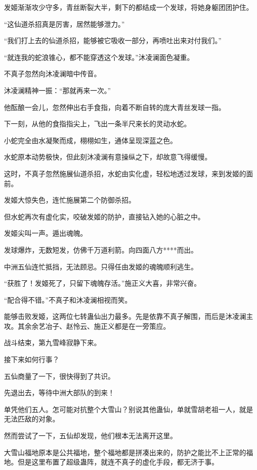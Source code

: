 \begin{this_body}
发姬渐渐攻少守多，青丝断裂大半，剩下的都结成一个发球，将她身躯团团护住。

“这仙道杀招真是厉害，居然能够泄力。”

“我们打上去的仙道杀招，能够被它吸收一部分，再喷吐出来对付我们。”

“就连我的蛇浪锥心，都不能穿透这个发球。”沐凌澜面色凝重。

不真子忽然向沐凌澜暗中传音。

沐凌澜精神一振：“那就再来一次。”

他酝酿一会儿，忽然伸出右手食指，向着不断自转的庞大青丝发球一指。

下一刻，从他的食指指尖上，飞出一条半尺来长的灵动水蛇。

小蛇完全由水凝聚而成，栩栩如生，通体呈现深蓝之色。

水蛇原本动势极快，但此刻沐凌澜有意操纵之下，却故意飞得缓慢。

这时，不真子忽然施展仙道杀招，水蛇由实化虚，轻松地透过发球，来到发姬的面前。

发姬大惊失色，连忙施展第二个防御杀招。

但水蛇再次有虚化实，咬破发姬的防护，直接钻入她的心脏之中。

发姬尖叫一声。遁出魂魄。

发球爆炸，无数短发，仿佛千万道利箭。向四面八方****而出。

中洲五仙连忙抵挡，无法顾忌。只得任由发姬的魂魄顺利逃生。

“获胜了！发姬死了，只留下魂魄存活。”施正义大喜，非常兴奋。

“配合得不错。”不真子和沐凌澜相视而笑。

能够击败发姬，这两位七转蛊仙出力最多。先是依靠不真子解围，而后是沐凌澜主攻。其余余艺冶子、赵怜云、施正义都是在一旁策应。

战斗结束，第九雪峰寂静下来。

接下来如何行事？

五仙商量了一下，很快得到了共识。

先退出去，等待中洲大部队的到来！

单凭他们五人。怎可能对抗整个大雪山？别说其他蛊仙，单就雪胡老祖一人，就是无法匹敌的对象。

然而尝试了一下，五仙却发现，他们根本无法离开这里。

大雪山福地原本是公共福地，整个福地都是拼凑出来的，防护之能比不上正常的福地。但是这里布置了超级蛊阵，就连不真子的虚化手段，都无济于事。


\end{this_body}
